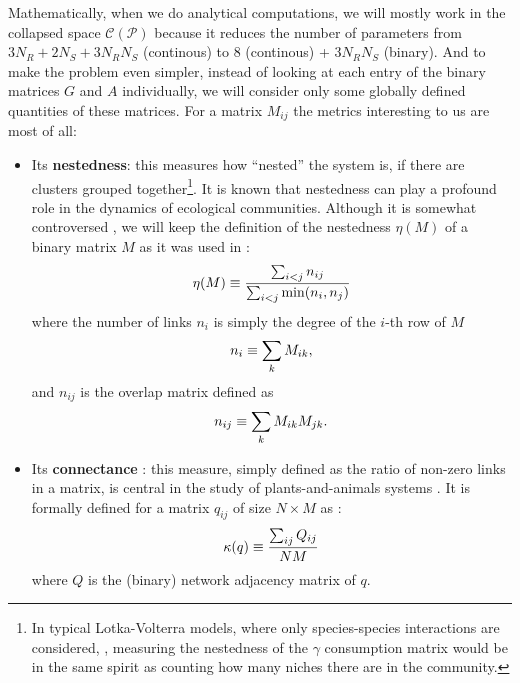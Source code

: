 \documentclass[12pt, titlepage]{report}
\begin{document}
Mathematically, when we do analytical computations, we will mostly work in the collapsed space $\mathcal{C}(\mathcal{P})$ because it reduces the number of parameters from $3N_R+2N_S+3N_RN_S$ (continous) to $8$ (continous) + $3N_RN_S$ (binary). And to make the problem even simpler, instead of looking at each entry of the binary matrices $G$ and $A$ individually, we will consider only some globally defined quantities of these matrices. For a matrix $M_{ij}$ the metrics interesting to us are most of all:
\begin{itemize}
\item Its \textbf{nestedness}: this measures how ``nested'' the system is, \ie if there are clusters grouped together\footnote{In typical Lotka-Volterra models, where only species-species interactions are considered, \eg \cite{iannelli_introduction_2014}, measuring the nestedness of the $\gamma$ consumption matrix would be in the same spirit as counting how many niches there are in the community.}. It is known \cite{bastolla_architecture_2009, pascual-garcia_mutualism_2017} that nestedness can play a profound role in the dynamics of ecological communities. Although it is somewhat controversed \cite{jonhson_factors_2013}, we will keep the definition of the nestedness $\eta(M)$ of a binary matrix $M$ as it was used in \cite{bastolla_architecture_2009}:
\begin{equation}
\eta(M)\equiv \frac{\sum_{i<j} n_{ij}}{\sum_{i < j} \min(n_i, n_j)}
\end{equation}
where the number of links $n_i$ is simply the degree of the $i$-th row of $M$
\begin{equation}
n_i \equiv \sum_k M_{ik},
\end{equation}
and $n_{ij}$ is the overlap matrix defined as
\begin{equation}
n_{ij}\equiv \sum_k M_{ik}M_{jk}.
\end{equation}

\item Its \textbf{connectance} : this measure, simply defined as the ratio of non-zero links in a matrix, is central in the study of plants-and-animals systems \cite{pascual-garcia_mutualism_2017}. It is formally defined for a matrix $q_{ij}$  of size $N\times M$ as :
\begin{equation}
\kappa(q)\equiv \frac{\sum_{ij} Q_{ij}}{NM}
\end{equation}
where $Q$ is the (binary) network adjacency matrix of $q$.
\end{itemize}
\end{document}
